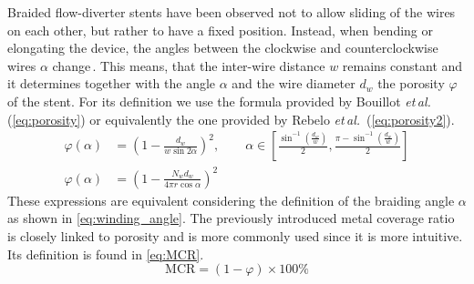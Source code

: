 Braided flow-diverter stents have been observed not to allow sliding of the wires on each other, but rather to have a fixed position. Instead, when bending or elongating the device, the angles between the clockwise and counterclockwise wires $\alpha$ change\,\cite{Bouillot2014,Bouillot2016,Shapiro2014a}. This means, that the inter-wire distance $w$ remains constant and it determines together with the angle $\alpha$ and the wire diameter $d_w$ the porosity $\varphi$ of the stent. For its definition we use the formula provided by Bouillot \textit{et\,al.}\,\cite{Bouillot2016} (\autoref{eq:porosity}) or equivalently the one provided by Rebelo \textit{et\,al.}\,\cite{Rebelo2015} (\autoref{eq:porosity2}).
\begin{align}
	\varphi(\alpha) & = {\left( 1 - \frac{d_w}{w\sin{2\alpha}} \right)}^2, \qquad \alpha \in \left[\frac{\sin^{-1}\left(\frac{d_w}{w}\right)}{2}, \frac{\pi - \sin^{-1}\left(\frac{d_w}{w}\right)}{2}\right]
	\label{eq:porosity}                                                                                                                                                                                      \\
	\varphi(\alpha) & = {\left( 1 - \frac{N_w d_w}{4\pi r \cos{\alpha}} \right)}^2
	\label{eq:porosity2}
\end{align}
These expressions are equivalent considering the definition of the braiding angle $\alpha$ as shown in \autoref{eq:winding_angle}. The previously introduced metal coverage ratio is closely linked to porosity and is more commonly used since it is more intuitive. Its definition is found in \autoref{eq:MCR}.
\begin{equation}
	\text{MCR} = (1 - \varphi)\times 100\%
	\label{eq:MCR}
\end{equation}

